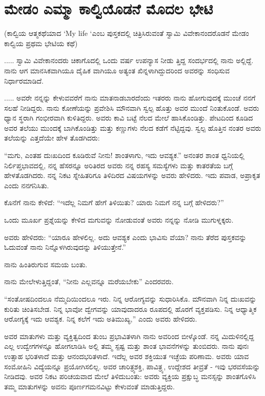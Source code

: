 
\chapter{ಮೇಡಂ ಎಮ್ಮಾ ಕಾಲ್ವಿಯೊಡನೆ ಮೊದಲ ಭೇಟಿ}

(ಕಾಲ್ವಿಯ ಆತ್ಮಕಥೆಯಾದ ‘My life ‘ಎಂಬ ಪುಸ್ತಕದಲ್ಲಿ ಚಿತ್ರಿಸಿರುವಂತೆ ಸ್ವಾಮಿ ವಿವೇಕಾನಂದರೊಡನೆ ಮೇಡಂ ಕಾಲ್ವಿಯ ಪ್ರಥಮ ಭೇಟಿಯ ಕಥೆ)

..... ಸ್ವಾಮಿ ವಿವೇಕಾನಂದರು ಚಿಕಾಗೊದಲ್ಲಿ ಒಂದು ವರ್ಷ ಉಪನ್ಯಾಸ ನೀಡು ತ್ತಿದ್ದ ಸಂದರ್ಭದಲ್ಲಿ ನಾನು ಅಲ್ಲಿದ್ದೆ. ನಾನು ಆಗ ಮಾನಸಿಕವಾಗಿಯೂ ದೈಹಿಕ ವಾಗಿಯೂ ಅತ್ಯಂತ ಖಿನ್ನಳಾಗಿದ್ದುದರಿಂದ ಅವರನ್ನು ಸಂಧಿಸುವ ನಿರ್ಧಾರಮಾಡಿದೆ.

..... ಅವರೇ ನನ್ನನ್ನು ಕೇಳುವವರೆಗೆ ನಾನು ಮಾತನಾಡಬಾರದೆಂದು ಇತರರು ನಾನು ಹೋಗುವುದಕ್ಕೆ ಮುಂಚೆ ನನಗೆ ಸಲಹೆ ನೀಡಿದ್ದರು. ನಾನು ಕೋಣೆಯನ್ನು ಪ್ರವೇಶಿಸಿ ಮೌನವಾಗಿ ಸ್ವಲ್ಪ ಹೊತ್ತು ಅವರ ಮುಂದೆ ನಿಂತುಕೊಂಡೆ. ಅವರು ಧ್ಯಾನ ಸ್ಥರಾಗಿ ಗಂಭೀರವಾಗಿ ಕುಳಿತಿದ್ದರು. ಅವರು ಕಾವಿ ಬಟ್ಟೆ ನೆಲದ ಮೇಲೆ ಹಾಸಿಕೊಂಡಿತ್ತು. ಪೇಟದಿಂದ ಕೂಡಿದ ಅವರ ತಲೆಯು ಮುಂದಕ್ಕೆ ಬಾಗಿಕೊಂಡಿತ್ತು ಮತ್ತು ಕಣ್ಣುಗಳು ನೆಲದ ಕಡೆಗೆ ನೆಟ್ಟಿದ್ದವು. ಸ್ವಲ್ಪ ಹೊತ್ತಿನ ನಂತರ ಅವರು ತಲೆಯನ್ನು ಎತ್ತದೆಯೇ ಹೇಳ ತೊಡಗಿದರು:

“ಮಗು, ಎಂತಹ ದುಃಖದಿಂದ ಕೂಡಿರುವೆ ನೀನು! ಶಾಂತಳಾಗು, ಇದು ಆವಶ್ಯಕ.” ಅನಂತರ ಶಾಂತ ಧ್ವನಿಯಲ್ಲಿ ನಿರ್ಲಿಪ್ತಭಾವದಲ್ಲಿ, ನನ್ನ ಹೆಸರನ್ನೂ ಅರಿತಿರದ ಅವರು ನನ್ನ ರಹಸ್ಯ ಸಮಸ್ಯೆಗಳು ಮತ್ತು ಕಾತರತೆಯ ಬಗ್ಗೆ ಹೇಳತೊಡಗಿದರು. ನನ್ನ ನಿಕಟ ಸ್ನೇಹಿತರಿಗೂ ತಿಳಿದಿರದ ವಿಷಯಗಳನ್ನು ಅವರು ಹೇಳಿದರು. ಇದು ಪವಾಡ, ಅಪ್ರಾಕೃತ ಎಂದು ನನಗನಿಸಿತು.

ಕೊನೆಗೆ ನಾನು ಕೇಳಿದೆ: “ಇದೆಲ್ಲ ನಿಮಗೆ ಹೇಗೆ ತಿಳಿಯಿತು? ಯಾರು ನಿಮಗೆ ನನ್ನ ಬಗ್ಗೆ ಹೇಳಿದರು?”

ಒಂದು ಮೂರ್ಖ ಪ್ರಶ್ನೆಯನ್ನು ಕೇಳಿದ ಮಗುವನ್ನು ನೋಡುವಂತೆ ಅವರು ನನ್ನನ್ನು ನೋಡಿ ಮುಗುಳ್ನಕ್ಕರು.

ಅವರು ಹೇಳಿದರು: “ಯಾರೂ ಹೇಳಲಿಲ್ಲ. ಅದು ಆವಶ್ಯಕ ಎಂದು ಭಾವಿಸು ವೆಯಾ? ನಾನು ತೆರೆದ ಪುಸ್ತಕವನ್ನು ಓದುವಂತೆ ನಾನು ನಿನ್ನೊಳಗಿರುವುದನ್ನು ತಿಳಿಯುತ್ತೇನೆ.”

ನಾನು ಹಿಂತಿರುಗುವ ಸಮಯ ಬಂತು.

ನಾನು ಮೇಲೇಳುತ್ತಿದ್ದಂತೆ, “ನೀನು ಎಲ್ಲವನ್ನೂ ಮರೆಯಬೇಕು” ಎಂದರವರು.

“ಸಂತೋಷದಿಂದಲೂ ನೆಮ್ಮದಿಯಿಂದಲೂ ಇರು. ನಿನ್ನ ಆರೋಗ್ಯವನ್ನು ಸುಧಾರಿಸಿಕೊ. ಮೌನವಾಗಿ ನಿನ್ನ ದುಃಖವನ್ನು ಕುರಿತು ಚಿಂತಿಸಬೇಡ. ನಿನ್ನ ಭಾವೋ ದ್ವೇಗವನ್ನು ಯಾವುದಾದರೂ ರೂಪದಲ್ಲಿ ಹೊರಗೆ ವ್ಯಕ್ತಪಡಿಸು. ನಿನ್ನ ಆಧ್ಯಾತ್ಮಿಕ ಆರೋಗ್ಯಕ್ಕೆ ಇದು ಆವಶ್ಯಕ. ನಿನ್ನ ಕಲೆಗೆ ಇದು ಅತಿಮುಖ್ಯ,” ಎಂದು ಅವರು ಹೇಳಿದರು.

ಅವರ ಮಾತುಗಳು ಮತ್ತು ವ್ಯಕ್ತಿತ್ವದಿಂದ ತುಂಬ ಪ್ರಭಾವಿತಳಾಗಿ ನಾನು ಅವರಿಂದ ಬೀಳ್ಕೊಂಡೆ. ನನ್ನ ಮಿದುಳಿನಲ್ಲಿದ್ದ ಎಲ್ಲ ಉದ್ವೇಗಗಳನ್ನೂ ಹೋಗಲಾಡಿಸಿ ಅಲ್ಲಿ ತಮ್ಮ ಸ್ಪಷ್ಟ ಮತ್ತು ಶಾಂತ ಭಾವನೆಗಳನ್ನು ತುಂಬಿದರು. ನಾನು ಪುನಃ ಉತ್ಸಾಹ ಭರಿತಳಾದೆ ಮತ್ತು ಆನಂದಭರಿತಳಾದೆ. ಇದೆಲ್ಲ ಅವರ ಶಕ್ತಿಯುತ ಇಚ್ಛೆಯ ಪರಿಣಾಮ. ಅವರು ಯಾವ ಸಂಮೋಹಿನಿ ವಿದ್ಯೆಯನ್ನೂ ಪ್ರಯೋಗಿಸಲಿಲ್ಲ. ಅವರ ಚಾರಿತ್ರ್ಯಶಕ್ತಿ, ಪಾವಿತ್ರ್ಯ, ಉದ್ದೇಶದ ತೀವ್ರತೆ - ಇವು ಭರವಸೆಯನ್ನು ನೀಡಿದವು. ಅವರ ನಿಕಟ ಪರಿಚಯವಾದ ಮೇಲೆ ತಿಳಿದುಬಂತು: ಅವರು ವ್ಯಕ್ತಿಯ ಪ್ರಕ್ಷುಬ್ಧ ಮನಸ್ಸನ್ನು ಶಾಂತಗೊಳಿಸಿ ತಮ್ಮ ಮಾತುಗಳನ್ನು ಅವನು ಪೂರ್ಣಗಮನವಿಟ್ಟು ಕೇಳುವಂತೆ ಮಾಡುತ್ತಿದ್ದರು.

